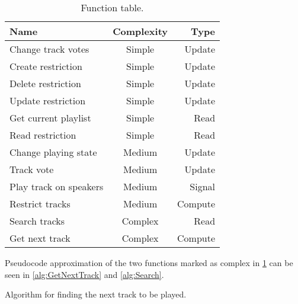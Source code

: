 \begin{table}[hbtp]
\centering
\begin{tabular}{lcr}
\toprule
\textbf{Name}									 & \textbf{Complexity}	& \textbf{Type} \\
\midrule
Change track votes             & Simple								& Update  \\
Create restriction             & Simple								& Update  \\
Delete restriction             & Simple								& Update  \\
Update restriction             & Simple								& Update  \\
Get current playlist           & Simple								& Read    \\
Read restriction               & Simple								& Read    \\
Change playing state           & Medium								& Update  \\
Track vote                     & Medium								& Update  \\
Play track on speakers         & Medium								& Signal  \\
Restrict tracks                & Medium								& Compute \\
Search tracks                  & Complex							& Read    \\
Get next track                 & Complex							& Compute \\
\bottomrule
\end{tabular}
\caption{Function table.}
\label{table:functionlist}
\end{table}

Pseudocode approximation of the two functions marked as complex in \cref{table:functionlist} can be seen in \cref{alg:GetNextTrack} and \cref{alg:Search}.

\begin{algorithm}[htbp]
\caption{Algorithm for finding the next track to be played.}\label{alg:GetNextTrack}
\begin{algorithmic}[1]
		\EndIf{}
			\Else{} 
					\EndIf{}
				\EndIf{}
			\EndIf{}
		\EndFor{}
	\EndFunction{}
\end{algorithmic}
\end{algorithm}

